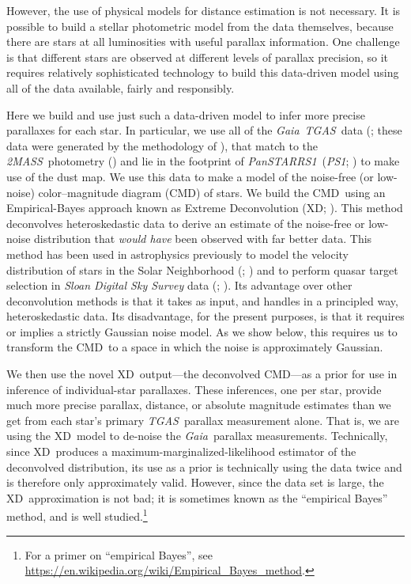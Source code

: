\documentclass[modern]{aastex61}
\newcommand{\acronym}[1]{{\small{#1}}}
\newcommand{\project}[1]{\textsl{#1}}
\newcommand{\tgas}{\project{\acronym{TGAS}}}
\newcommand{\tmass}{\project{\acronym{2MASS}}}
\newcommand{\psone}{\project{\acronym{PS1}}}
\newcommand{\gaia}{\project{Gaia}}
\newcommand{\panstarrs}{\project{Pan\acronym{STARRS1}}}
\newcommand{\xd}{\acronym{XD}}
\newcommand{\cmd}{\acronym{CMD}}
\begin{document}
However, the use of physical models for distance estimation is not necessary.
It is possible to build a stellar photometric model from the data themselves,
because there are stars at all luminosities with useful parallax information.
One challenge is that different stars are observed at different levels of parallax precision,
so it requires relatively sophisticated technology to build this data-driven model
using all of the data available, fairly and responsibly.

Here we build and use just such a data-driven model to infer more precise parallaxes for each star.
In particular, we use all of the \gaia\ \tgas\ data (\citealt{tgas};
these data were generated by the methodology of \citealt{michalik15}), that match to the
\tmass\ photometry (\citealt{skrutskie06}) and lie in the footprint of \panstarrs\ (\psone; \citealt{ps1})
to make use of the \cite{green15} dust map. We use this data to make a model of the
noise-free (or low-noise) color--magnitude diagram (\cmd) of stars.
We build the \cmd\ using an Empirical-Bayes approach known as Extreme Deconvolution (XD;
\citealt{bovy11}).
This method deconvolves heteroskedastic data to derive an
estimate of the noise-free or low-noise distribution that \emph{would
  have} been observed with far better data.
This method has been used in astrophysics
previously to model the velocity distribution of stars in the Solar
Neighborhood (\citealt{hogg05}; \citealt{bovy09}) and to
perform quasar target selection
in \project{Sloan Digital Sky Survey} data (\citealt{xdqso}; \citealt{xdqsoz}).
Its advantage over other deconvolution methods is that it takes as input,
and handles in a principled way, heteroskedastic data.
Its disadvantage, for the present purposes, is that it requires
or implies a strictly Gaussian noise model.
As we show below, this requires us to transform the \cmd\ to a space in which
the noise is approximately Gaussian.

We then use the novel \xd\ output---the deconvolved \cmd---as
a prior for use in inference of individual-star parallaxes.
These inferences, one per star, provide much more precise parallax, distance,
or absolute magnitude estimates than we get from each star's primary
\tgas\ parallax measurement alone.
That is, we are using the \xd\ model to de-noise the \gaia\ parallax
measurements.
Technically, since \xd\ produces a maximum-marginalized-likelihood estimator
of the deconvolved distribution,
its use as a prior is technically using the data twice and is therefore only approximately valid.
However, since the data set is large, the \xd\ approximation is not bad; it is
sometimes known as the ``empirical Bayes'' method, and is well studied.\footnote{For a primer on ``empirical Bayes'', see \url{https://en.wikipedia.org/wiki/Empirical_Bayes_method}.}
\end{document}
